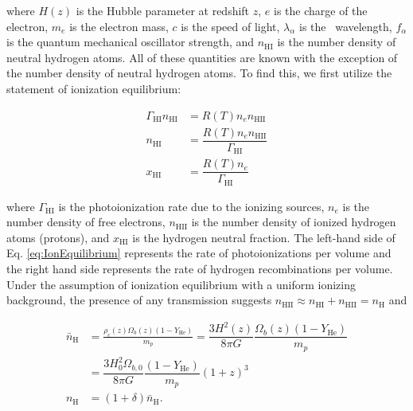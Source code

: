 where $H(z)$ is the Hubble parameter at redshift $z$, $e$ is the charge of the electron, $m_e$ is the electron mass, $c$ is the speed of light, $\lambda_{\alpha}$ is the \lya\ wavelength, $f_{\alpha}$ is the quantum mechanical oscillator strength, and $n_{\text{HI}}$ is the number density of neutral hydrogen atoms. All of these quantities are known with the exception of the number density of neutral hydrogen atoms. To find this, we first utilize the statement of ionization equilibrium:

\begin{align}
\Gamma_{\text{HI}} n_{\text{HI}} &= R(T)n_{e}n_{\text{HII}} \label{eq:IonEquilibrium} \\
n_{\text{HI}} &= \dfrac{R(T) n_{e} n_{\text{HII}}}{\Gamma_{\text{HI}}} \label{eq:nH}\\
x_{\text{HI}} &= \dfrac{R(T)n_e}{\Gamma_{\text{HI}}} \label{eq:xHI}
\end{align}

where $\Gamma_{\text{HI}}$ is the photoionization rate due to the ionizing sources, $n_{e}$ is the number density of free electrons, $n_{\text{HII}}$ is the number density of ionized hydrogen atoms (protons), and $x_{\text{HI}}$ is the hydrogen neutral fraction. The left-hand side of Eq. \ref{eq:IonEquilibrium} represents the rate of photoionizations per volume and the right hand side represents the rate of hydrogen recombinations per volume. Under the assumption of ionization equilibrium with a uniform ionizing background, the presence of any transmission suggests $n_{\text{HII}} \approx n_{\text{HI}} + n_{\text{HII}} = n_{\text{H}}$ and 

\begin{align}
\bar{n}_{\text{H}} &= \frac{\rho_{c}(z)\Omega_{b}(z)(1-Y_{\text{He}})}{m_p} = \dfrac{3H^{2}(z)}{8\pi G} \dfrac{\Omega_{b}(z) (1-Y_{\text{He}})}{m_{p}} \\
&= \dfrac{3H_{0}^{2}\Omega_{b,0}}{8\pi G} \dfrac{(1-Y_{\text{He}})}{m_p}(1+z)^{3}\\
n_{\text{H}} &= (1+\delta) \bar{n}_{\text{H}}. \label{eq:ntot}
\end{align}

